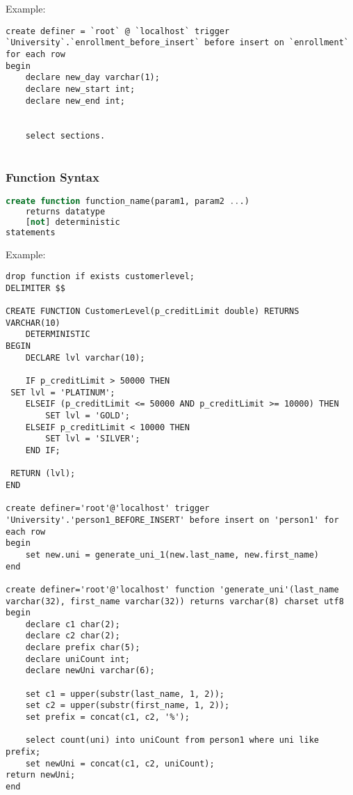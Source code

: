 Example:
\begin{lstlisting}
create definer = `root` @ `localhost` trigger `University`.`enrollment_before_insert` before insert on `enrollment` for each row 
begin
	declare new_day varchar(1);
    declare new_start int;
    declare new_end int;
    
    
    select sections.
	
\end{lstlisting}
\subsubsection*{Function Syntax}
\begin{lstlisting}[language=SQL]
create function function_name(param1, param2 ...)
	returns datatype
    [not] deterministic
statements
\end{lstlisting}

Example:
\begin{lstlisting}
drop function if exists customerlevel;
DELIMITER $$
 
CREATE FUNCTION CustomerLevel(p_creditLimit double) RETURNS VARCHAR(10)
    DETERMINISTIC
BEGIN
    DECLARE lvl varchar(10);
 
    IF p_creditLimit > 50000 THEN
 SET lvl = 'PLATINUM';
    ELSEIF (p_creditLimit <= 50000 AND p_creditLimit >= 10000) THEN
        SET lvl = 'GOLD';
    ELSEIF p_creditLimit < 10000 THEN
        SET lvl = 'SILVER';
    END IF;
 
 RETURN (lvl);
END

create definer='root'@'localhost' trigger 'University'.'person1_BEFORE_INSERT' before insert on 'person1' for each row
begin
	set new.uni = generate_uni_1(new.last_name, new.first_name)
end

create definer='root'@'localhost' function 'generate_uni'(last_name varchar(32), first_name varchar(32)) returns varchar(8) charset utf8
begin
	declare c1 char(2);
    declare c2 char(2);
    declare prefix char(5);
    declare uniCount int;
    declare newUni varchar(6);
    
    set c1 = upper(substr(last_name, 1, 2));
    set c2 = upper(substr(first_name, 1, 2));
    set prefix = concat(c1, c2, '%');
    
    select count(uni) into uniCount from person1 where uni like prefix;
    set newUni = concat(c1, c2, uniCount);
return newUni;
end



\end{lstlisting}


